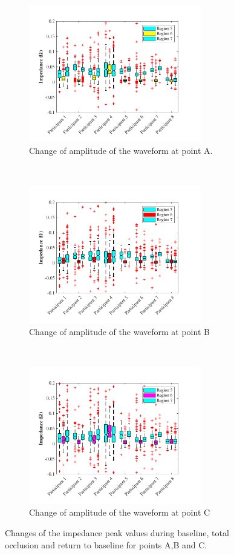 \begin{figure}[!htbp]
	\centering
	\begin{subfigure}[t]{0.48\textwidth}
		\centering
		\includegraphics[height=6cm,keepaspectratio]{figure11a2}    
		\caption{Change of amplitude of the waveform at point A.}
		\label{fig:change_A_total}
	\end{subfigure}%
	~ 
	\begin{subfigure}[t]{0.48\textwidth}
		\centering
		\includegraphics[height=6cm,keepaspectratio]{figure11b2}    
		\caption{Change of amplitude of the waveform at point B}
		\label{fig:change_B_total}
	\end{subfigure}
	~
	\begin{subfigure}[t]{0.48\textwidth}
		\centering
		\includegraphics[height=6cm,keepaspectratio]{figure11c2}    
		\caption{Change of amplitude of the waveform at point C}
		\label{fig:change_C_total}
	\end{subfigure}%
	\caption{Changes of the impedance peak values during baseline, total occlusion and return to baseline for points A,B and C.}
	\label{fig:iPG_change_points_total}
\end{figure}


